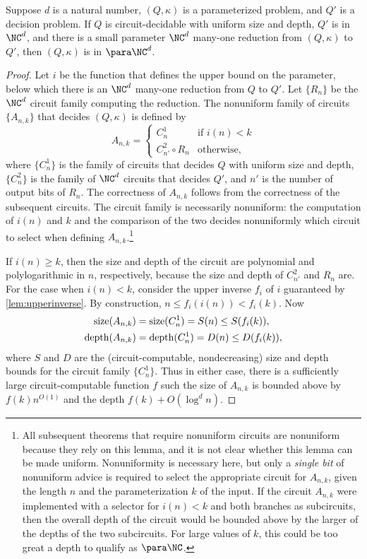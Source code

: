 \begin{lemma}\label{lem:spreduction}
  Suppose $d$ is a natural number, $(Q, \kappa)$ is a parameterized problem, and $Q'$ is a decision problem.
  If $Q$ is circuit-decidable with uniform size and depth, $Q'$ is in $\NC^d$, and there is a small parameter $\NC^d$ many-one reduction from $(Q, \kappa)$ to $Q'$, then $(Q, \kappa)$ is in $\para \NC^d$.
\end{lemma}
\begin{proof}
  Let $i$ be the function that defines the upper bound on the parameter, below which there is an $\NC^d$ many-one reduction from $Q$ to $Q'$.
  Let $\{R_n\}$ be the $\NC^d$ circuit family computing the reduction.
  The nonuniform family of circuits $\{A_{n, k}\}$ that decides $(Q, \kappa)$ is defined by
  \[
  A_{n, k} =
  \begin{cases}
    C_n^1 & \text{if } i(n) < k \\
    C_{n'}^2 \circ R_{n} & \text{otherwise},
  \end{cases}
  \]
  where $\{C_n^1\}$ is the family of circuits that decides $Q$ with uniform size and depth, $\{C_n^2\}$ is the family of $\NC^d$ circuits that decides $Q'$, and $n'$ is the number of output bits of $R_n$.
  The correctness of $A_{n, k}$ follows from the correctness of the subsequent circuits.
  The circuit family is necessarily nonuniform: the computation of $i(n)$ and $k$ and the comparison of the two decides nonuniformly which circuit to select when defining $A_{n, k}$.\footnote{
  All subsequent theorems that require nonuniform circuits are nonuniform because they rely on this lemma, and it is not clear whether this lemma can be made uniform.
  Nonuniformity is necessary here, but only a \emph{single bit} of nonuniform advice is required to select the appropriate circuit for $A_{n, k}$, given the length $n$ and the parameterization $k$ of the input.
  If the circuit $A_{n, k}$ were implemented with a selector for $i(n) < k$ and both branches as subcircuits, then the overall depth of the circuit would be bounded above by the larger of the depths of the two subcircuits.
  For large values of $k$, this could be too great a depth to qualify as $\para \NC$.
}

  If $i(n) \geq k$, then the size and depth of the circuit are polynomial and polylogarithmic in $n$, respectively, because the size and depth of $C_{n'}^2$ and $R_n$ are.
  For the case when $i(n) < k$, consider the upper inverse $f_i$ of $i$ guaranteed by \autoref{lem:upperinverse}.
  By construction, $n \leq f_i(i(n)) < f_i(k)$.
  Now
  \begin{align*}
    \operatorname{size}(A_{n, k}) & = \operatorname{size}(C_n^1) = S(n) \leq S(f_i(k)), \\
    \operatorname{depth}(A_{n, k}) & = \operatorname{depth}(C_n^1) = D(n) \leq D(f_i(k)),
  \end{align*}
  where $S$ and $D$ are the (circuit-computable, nondecreasing) size and depth bounds for the circuit family $\{C_n^1\}$.
  Thus in either case, there is a sufficiently large circuit-computable function $f$ such the size of $A_{n, k}$ is bounded above by $f(k) n^{O(1)}$ and the depth $f(k) + O(\log^d n)$.
\end{proof}


